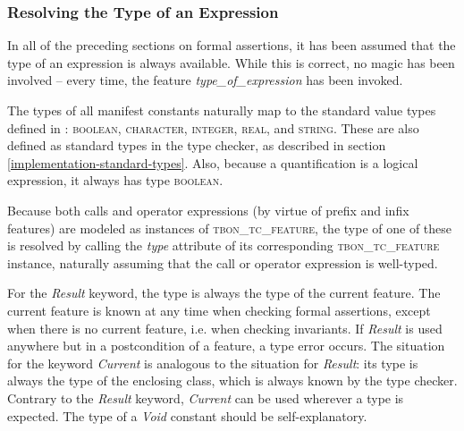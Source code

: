 \subsubsection{Resolving the Type of an Expression}
In all of the preceding sections on formal assertions, it has been assumed that the type of an expression is always available. While this is correct, no magic has been involved -- every time, the feature \textit{type\_of\_expression} has been invoked.

The types of all manifest constants naturally map to the standard value types defined in \bon{} \cite[p.~51]{walden1995}: \textsc{boolean}, \textsc{character}, \textsc{integer}, \textsc{real}, and \textsc{string}. These are also defined as standard types in the type checker, as described in section \ref{implementation-standard-types}. Also, because a quantification is a logical expression, it always has type \textsc{boolean}.

Because both calls and operator expressions (by virtue of prefix and infix features) are modeled as instances of \textsc{tbon\_tc\_feature}, the type of one of these is resolved by calling the \textit{type} attribute of its corresponding \textsc{tbon\_tc\_feature} instance, naturally assuming that the call or operator expression is well-typed.

For the \textit{Result} keyword, the type is always the type of the current feature. The current feature is known at any time when checking formal assertions, except when there is no current feature, i.e. when checking invariants. If \textit{Result} is used anywhere but in a postcondition of a feature, a type error occurs. The situation for the keyword \textit{Current} is analogous to the situation for \textit{Result}: its type is always the type of the enclosing class, which is always known by the type checker. Contrary to the \textit{Result} keyword, \textit{Current} can be used wherever a type is expected. The type of a \textit{Void} constant should be self-explanatory. 

